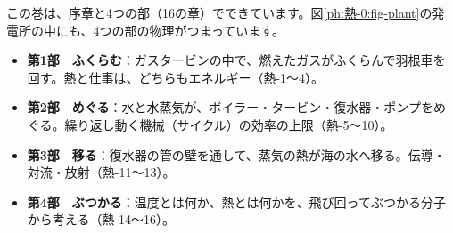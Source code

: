 \leavevmode\label{ph:熱-0:sec6}この巻は、序章と4つの部（16の章）でできています。図\ref{ph:熱-0:fig-plant}の発電所の中にも、4つの部の物理がつまっています。
\begin{itemize}[leftmargin=1.2\zw, itemsep=2pt, topsep=2pt, label={\color{bkTheme}●}]
\item \textbf{第1部　ふくらむ}：ガスタービンの中で、燃えたガスがふくらんで羽根車を回す。熱と仕事は、どちらもエネルギー（熱-1〜4）。
\item \textbf{第2部　めぐる}：水と水蒸気が、ボイラー・タービン・復水器・ポンプをめぐる。繰り返し動く機械（サイクル）の効率の上限（熱-5〜10）。
\item \textbf{第3部　移る}：復水器の管の壁を通して、蒸気の熱が海の水へ移る。伝導・対流・放射（熱-11〜13）。
\item \textbf{第4部　ぶつかる}：温度とは何か、熱とは何かを、飛び回ってぶつかる分子から考える（熱-14〜16）。
\end{itemize}
